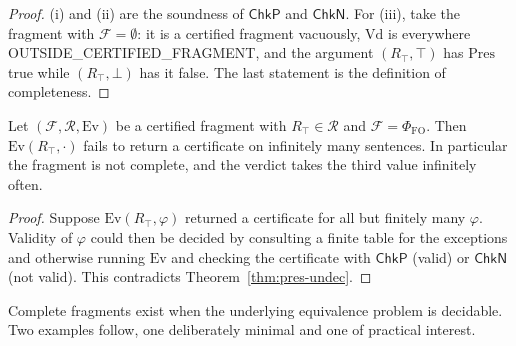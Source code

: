 \begin{proof}
(i) and (ii) are the soundness of $\mathsf{ChkP}$ and $\mathsf{ChkN}$. For (iii), take the fragment with $\mathcal F=\emptyset$: it is a certified fragment vacuously, $\mathrm{Vd}$ is everywhere \textsf{OUTSIDE\_CERTIFIED\_FRAGMENT}, and the argument $(R_\top,\top)$ has $\mathrm{Pres}$ true while $(R_\top,\bot)$ has it false. The last statement is the definition of completeness.
\end{proof}

\begin{theorem}
\label{thm:no-total-fragment}
Let $(\mathcal F,\mathcal R,\mathrm{Ev})$ be a certified fragment with $R_\top\in\mathcal R$ and $\mathcal F=\Phi_{\mathrm{FO}}$. Then $\mathrm{Ev}(R_\top,\cdot)$ fails to return a certificate on infinitely many sentences. In particular the fragment is not complete, and the verdict takes the third value infinitely often.
\end{theorem}

\begin{proof}
Suppose $\mathrm{Ev}(R_\top,\varphi)$ returned a certificate for all but finitely many $\varphi$. Validity of $\varphi$ could then be decided by consulting a finite table for the exceptions and otherwise running $\mathrm{Ev}$ and checking the certificate with $\mathsf{ChkP}$ (valid) or $\mathsf{ChkN}$ (not valid). This contradicts Theorem~\ref{thm:pres-undec}.
\end{proof}

Complete fragments exist when the underlying equivalence problem is decidable. Two examples follow, one deliberately minimal and one of practical interest.

